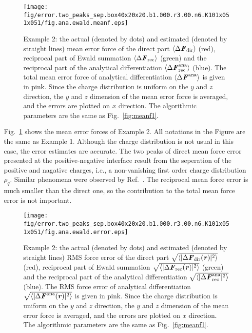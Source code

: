 \documentclass[aps,pre,preprint]{revtex4}
\renewcommand{\v}[1]{\textbf{\textit{#1}}}
\begin{document}
\begin{figure}
  \centering
  \texttt{[image: fig/error.two\_peaks\_sep.box40x20x20.b1.000.r3.00.n6.K101x051x051/fig.ana.ewald.meanf.eps]}
  \caption{Example 2: the actual (denoted by dots) and estimated
    (denoted by straight lines) mean error force of the direct part
    $\langle\Delta \v F_{\textrm{dir}}\rangle$ (red), reciprocal part
    of Ewald summation $\langle\Delta \v F_{\textrm{rec}}\rangle$
    (green) and the reciprocal part of the analytical differentiation
    $\langle\Delta \v F^{\textrm{ana}}_{\textrm{rec}}\rangle$
    (blue). The total mean error force of analytical differentiation
    $\langle\Delta \v F^{\textrm{ana}}\rangle$ is given in pink.
    Since the charge distribution is uniform on the $y$ and $z$
    direction, the $y$ and $z$ dimension of the mean error force is
    averaged, and the errors are plotted on $x$ direction. The
    algorithmic parameters are the same as Fig.~\ref{fig:meanf1}.}
  \label{fig:meanf2}
\end{figure}

Fig.~\ref{fig:meanf2} shows the mean error forces of Example 2. All
notations in the Figure are the same as Example 1.  Although the
charge distribution is not usual in this case, the error estimates are
accurate. The two peaks of direct mean force error presented at the
positive-negative interface result from the seperation of the positive
and nagative charges, i.e., a non-vanishing first order charge
distribution $\rho_q$.  Similar phenomena were observed by
Ref.~\cite{wang2012}. The reciprocal mean force error is much smaller
than the direct one, so the contribution to the total mean force error
is not important.

\begin{figure}
  \centering
  \texttt{[image: fig/error.two\_peaks\_sep.box40x20x20.b1.000.r3.00.n6.K101x051x051/fig.ana.ewald.error.eps]}
  \caption{Example 2: the actual (denoted by dots) and estimated
    (denoted by straight lines) RMS force error of the direct part
    $\sqrt{\langle\vert\Delta \v F_{\textrm{dir}}(\v
      r)\vert^2\rangle}$ (red), reciprocal part of Ewald summation
    $\sqrt{\langle\vert\Delta \v F_{\textrm{rec}}(\v
      r)\vert^2\rangle}$ (green) and the reciprocal part of the
    analytical differentiation $\sqrt{\langle\vert\Delta \v
      F^{\textrm{ana}}_{\textrm{rec}}\vert^2\rangle}$ (blue). The RMS
    force error of analytical differentiation
    $\sqrt{\langle\vert\Delta \v F^{\textrm{ana}}(\v
      r)\vert^2\rangle}$ is given in pink.  Since the charge
    distribution is uniform on the $y$ and $z$ direction, the $y$ and
    $z$ dimension of the mean error force is averaged, and the errors
    are plotted on $x$ direction. The algorithmic parameters are the
    same as Fig.~\ref{fig:meanf1}.}
  \label{fig:error2}
\end{figure}
\end{document}
